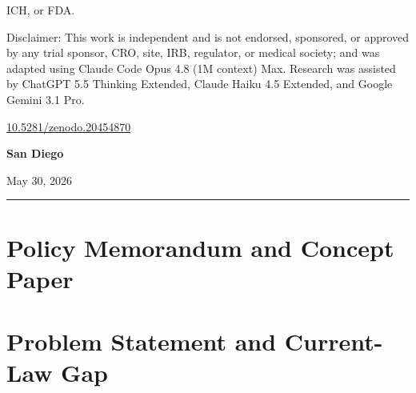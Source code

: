 \documentclass[11pt]{article}
\begin{document}
\begin{titlepage}
\begin{minipage}{0.86\textwidth}
ICH, or FDA.
\par\vspace{\baselineskip}
Disclaimer: This work is independent and is not endorsed, sponsored, or approved
by any trial sponsor, CRO, site, IRB, regulator, or medical society; and was
adapted using Claude Code Opus 4.8 (1M context) Max. Research was assisted by ChatGPT 5.5 Thinking Extended, Claude Haiku 4.5 Extended, and Google Gemini 3.1 Pro.
\par\vspace{\baselineskip}
\href{https://doi.org/10.5281/zenodo.20454870}{10.5281/zenodo.20454870}
\end{minipage}\par
\vspace{1.7cm}
{\bfseries San Diego\par}
\vspace{1.7cm}
{\normalsize May 30, 2026\par}
\vfill
{\color{billnavy}\rule{\textwidth}{1pt}}\par


\end{titlepage}
 

\tableofcontents
\clearpage
{}

\begin{abstract}

\end{abstract}


\vspace{0.2cm}

\section{Policy Memorandum and Concept Paper}
\label{sec:policy_memo}


\section{Problem Statement and Current-Law Gap}
\label{sec:problem_statement}

\end{document}
